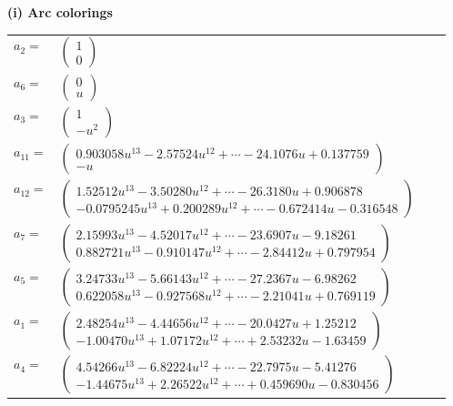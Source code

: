 \documentclass[1p]{elsarticle_modified}
\theoremstyle{definition}
\begin{document}
\flushleft \textbf{(i) Arc colorings}\\
\begin{tabular}{m{7pt} m{180pt} m{7pt} m{180pt} }
\flushright $a_{2}=$&$\begin{pmatrix}1\\0\end{pmatrix}$ \\
\flushright $a_{6}=$&$\begin{pmatrix}0\\u\end{pmatrix}$ \\
\flushright $a_{3}=$&$\begin{pmatrix}1\\- u^2\end{pmatrix}$ \\
\flushright $a_{11}=$&$\begin{pmatrix}0.903058 u^{13}-2.57524 u^{12}+\cdots-24.1076 u+0.137759\\- u\end{pmatrix}$ \\
\flushright $a_{12}=$&$\begin{pmatrix}1.52512 u^{13}-3.50280 u^{12}+\cdots-26.3180 u+0.906878\\-0.0795245 u^{13}+0.200289 u^{12}+\cdots-0.672414 u-0.316548\end{pmatrix}$ \\
\flushright $a_{7}=$&$\begin{pmatrix}2.15993 u^{13}-4.52017 u^{12}+\cdots-23.6907 u-9.18261\\0.882721 u^{13}-0.910147 u^{12}+\cdots-2.84412 u+0.797954\end{pmatrix}$ \\
\flushright $a_{5}=$&$\begin{pmatrix}3.24733 u^{13}-5.66143 u^{12}+\cdots-27.2367 u-6.98262\\0.622058 u^{13}-0.927568 u^{12}+\cdots-2.21041 u+0.769119\end{pmatrix}$ \\
\flushright $a_{1}=$&$\begin{pmatrix}2.48254 u^{13}-4.44656 u^{12}+\cdots-20.0427 u+1.25212\\-1.00470 u^{13}+1.07172 u^{12}+\cdots+2.53232 u-1.63459\end{pmatrix}$ \\
\flushright $a_{4}=$&$\begin{pmatrix}4.54266 u^{13}-6.82224 u^{12}+\cdots-22.7975 u-5.41276\\-1.44675 u^{13}+2.26522 u^{12}+\cdots+0.459690 u-0.830456\end{pmatrix}$ \\

\end{tabular}
\end{document}
